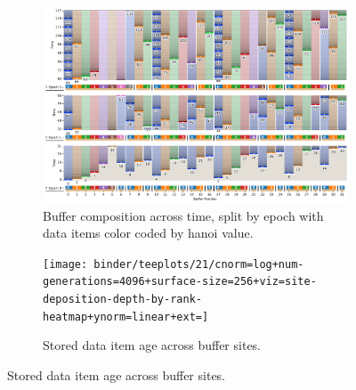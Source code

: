 \begin{figure}[h!]
  \centering

\begin{subfigure}[b]{\linewidth}
\includegraphics[width=\linewidth]{
binder/teeplots/20/num-generations=128+surface-size=32+viz=site-reservation-by-rank-spliced-at-heatmap+ext=}
\vspace{-4ex}\caption{
  Buffer composition across time, split by epoch with data items color coded by hanoi value.
}
\end{subfigure}

\vspace{1ex}\begin{minipage}[]{\textwidth}
 \vspace{-2pt}
  \begin{subfigure}[t]{0.7\linewidth}
    \vspace{0pt}
    \centering
  \texttt{[image: binder/teeplots/21/cnorm=log+num-generations=4096+surface-size=256+viz=site-deposition-depth-by-rank-heatmap+ynorm=linear+ext=]}
  \end{subfigure}%
  \begin{subfigure}[t]{0.3\linewidth}
  \vspace{-2pt}
  \caption{%
    Stored data item age across buffer sites.
  }
\end{subfigure}
\end{minipage}


\end{figure}
